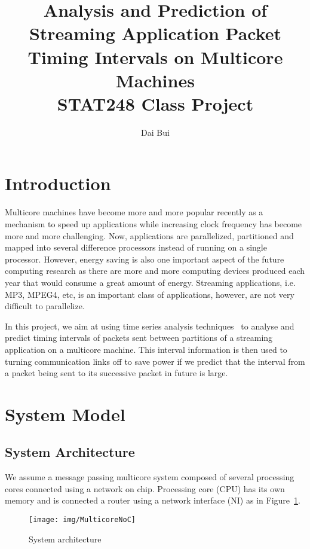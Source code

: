 \documentclass[12pt]{article}
\begin{document}
\title{Analysis and Prediction of Streaming
Application Packet Timing Intervals on Multicore Machines\\
STAT248 Class Project}
\author{Dai Bui}
\maketitle
\section{Introduction}
Multicore machines have become more and more popular recently as a mechanism to
speed up applications while increasing clock frequency has become more and more
challenging. Now, applications are parallelized, partitioned and mapped into
several difference processors instead of running on a single processor. However, energy
saving is also one important aspect of the future computing research as there
are more and more computing devices produced each year that would consume a great
amount of energy. Streaming applications, i.e. MP3, MPEG4, etc, is an
important class of applications, however, are not very difficult to parallelize.

In this project, we aim at using time series analysis
techniques~\cite{BrillingerTimeSeries, ShumwayTimeSeries} to analyse and predict
timing intervals of packets sent between partitions of a streaming
application on a multicore machine. This interval information is then used to
turning communication links off to save power if we predict that the interval
from a packet being sent to its successive packet in future is large. 

\section{System Model}
\subsection{System Architecture}
We assume a message passing multicore system composed of several processing
cores connected using a network on chip. Processing core (CPU) has its own
memory and is connected a router using a network interface (NI) as in
Figure~\ref{fig:MulticoreNoC}.

\begin{figure}[ht!]
\centering
\texttt{[image: img/MulticoreNoC]}
\caption{System architecture}\label{fig:MulticoreNoC}
\end{figure}
\end{document}
